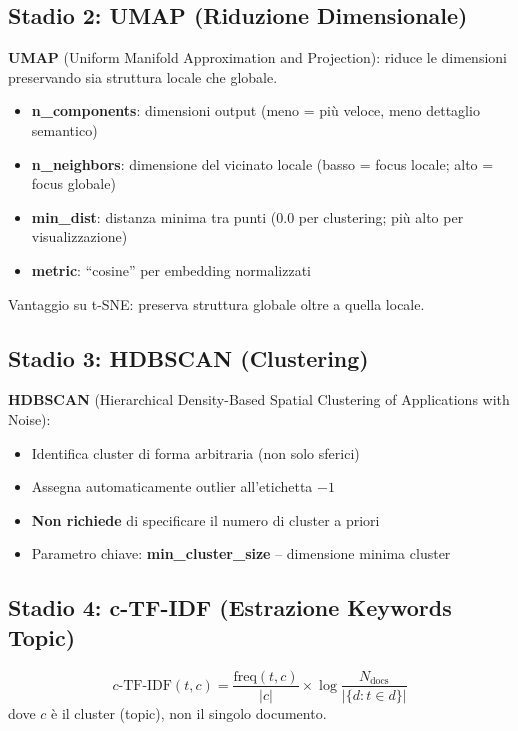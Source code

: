 \documentclass[12pt,a4paper]{article}
\begin{document}
\subsection{Stadio 2: UMAP (Riduzione Dimensionale)}

\begin{defbox}
\textbf{UMAP} (Uniform Manifold Approximation and Projection): riduce le dimensioni preservando sia struttura locale che globale.
\begin{itemize}
  \item \textbf{n\_components}: dimensioni output (meno = pi\`u veloce, meno dettaglio semantico)
  \item \textbf{n\_neighbors}: dimensione del vicinato locale (basso = focus locale; alto = focus globale)
  \item \textbf{min\_dist}: distanza minima tra punti (0.0 per clustering; pi\`u alto per visualizzazione)
  \item \textbf{metric}: ``cosine'' per embedding normalizzati
\end{itemize}
Vantaggio su t-SNE: preserva struttura globale oltre a quella locale.
\end{defbox}

\subsection{Stadio 3: HDBSCAN (Clustering)}

\begin{defbox}
\textbf{HDBSCAN} (Hierarchical Density-Based Spatial Clustering of Applications with Noise):
\begin{itemize}
  \item Identifica cluster di forma arbitraria (non solo sferici)
  \item Assegna automaticamente outlier all'etichetta $-1$
  \item \textbf{Non richiede} di specificare il numero di cluster a priori
  \item Parametro chiave: \textbf{min\_cluster\_size} -- dimensione minima cluster
\end{itemize}
\end{defbox}

\subsection{Stadio 4: c-TF-IDF (Estrazione Keywords Topic)}

\begin{formulabox}
\[
c\text{-TF-IDF}(t, c) = \frac{\text{freq}(t, c)}{|c|} \times \log\frac{N_{\text{docs}}}{|\{d : t \in d\}|}
\]
dove $c$ \`e il cluster (topic), non il singolo documento.
\end{formulabox}
\end{document}

